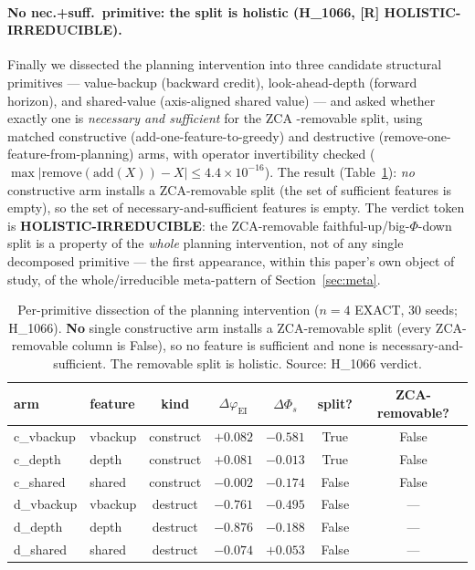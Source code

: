 \documentclass[11pt,a4paper]{article}
\providecommand{\tierRed}{\textcolor{red!70!black}{\textbf{[R]}}}
\newcommand{\faithful}{\ensuremath{\varphi_{\mathrm{EI}}}}
\newcommand{\bigphi}{\ensuremath{\Phi_{s}}}
\begin{document}
\paragraph{No nec.+suff.\ primitive: the split is holistic (H\_1066, \tierRed{}
HOLISTIC-IRREDUCIBLE).} Finally we dissected the planning intervention into
three candidate structural primitives --- value-backup (backward credit),
look-ahead-depth (forward horizon), and shared-value (axis-aligned shared
value) --- and asked whether exactly one is \emph{necessary and sufficient} for
the ZCA \citep{bell1997ica}-removable split, using matched constructive
(add-one-feature-to-greedy)
and destructive (remove-one-feature-from-planning) arms, with operator
invertibility checked ($\max|\mathrm{remove}(\mathrm{add}(X))-X|\le 4.4\times
10^{-16}$). The result (Table~\ref{tab:dissect}): \emph{no} constructive arm
installs a ZCA-removable split (the set of sufficient features is empty), so the
set of necessary-and-sufficient features is empty. The verdict token is
\textbf{HOLISTIC-IRREDUCIBLE}: the ZCA-removable faithful-up/big-$\Phi$-down
split is a property of the \emph{whole} planning intervention, not of any single
decomposed primitive --- the first appearance, within this paper's own object of
study, of the whole/irreducible meta-pattern of Section~\ref{sec:meta}.

\begin{table}[h]
\centering
\small
\begin{tabular}{llccccc}
\toprule
\textbf{arm} & \textbf{feature} & \textbf{kind} & \textbf{$\Delta$\faithful} & \textbf{$\Delta$\bigphi} & \textbf{split?} & \textbf{ZCA-removable?} \\
\midrule
c\_vbackup & vbackup & construct & $+0.082$ & $-0.581$ & True  & False \\
c\_depth   & depth   & construct & $+0.081$ & $-0.013$ & True  & False \\
c\_shared  & shared  & construct & $-0.002$ & $-0.174$ & False & False \\
d\_vbackup & vbackup & destruct  & $-0.761$ & $-0.495$ & False & --- \\
d\_depth   & depth   & destruct  & $-0.876$ & $-0.188$ & False & --- \\
d\_shared  & shared  & destruct  & $-0.074$ & $+0.053$ & False & --- \\
\bottomrule
\end{tabular}
\caption{Per-primitive dissection of the planning intervention ($n=4$ EXACT,
30 seeds; H\_1066). \textbf{No} single constructive arm installs a ZCA-removable
split (every ZCA-removable column is False), so no feature is sufficient and
none is necessary-and-sufficient. The removable split is holistic. Source:
H\_1066 verdict.}
\label{tab:dissect}
\end{table}
\end{document}

